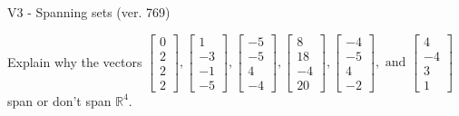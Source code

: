 \begin{exercise}
  \begin{exerciseTitle}V3 - Spanning sets (ver. 769)\end{exerciseTitle}
  \begin{exerciseStatement}
    Explain why the vectors \(\left[\begin{array}{r}
0 \\
2 \\
2 \\
2
\end{array}\right] , \left[\begin{array}{r}
1 \\
-3 \\
-1 \\
-5
\end{array}\right] , \left[\begin{array}{r}
-5 \\
-5 \\
4 \\
-4
\end{array}\right] , \left[\begin{array}{r}
8 \\
18 \\
-4 \\
20
\end{array}\right] , \left[\begin{array}{r}
-4 \\
-5 \\
4 \\
-2
\end{array}\right] , \text{ and } \left[\begin{array}{r}
4 \\
-4 \\
3 \\
1
\end{array}\right]\) span or don't span \(\mathbb{R}^4\). 
	



\end{exerciseStatement}
\end{exercise}
